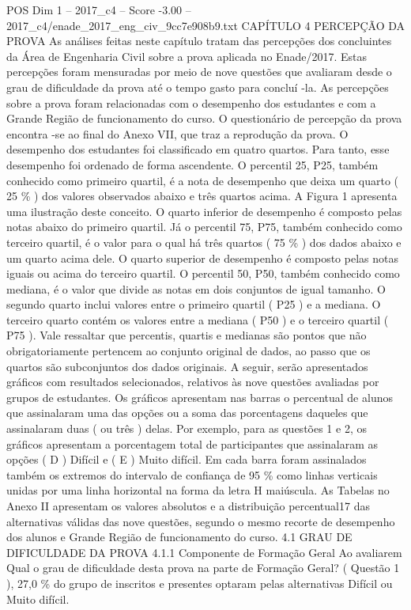 \begin{textsample}{POS Dim 1 – 2017\_c4 – Score -3.00 – 2017\_c4/enade\_2017\_eng\_civ\_9cc7e908b9.txt}  \label{ex:f1_pos_277}
CAPÍTULO 4 PERCEPÇÃO DA PROVA As análises feitas neste capítulo tratam das percepções dos concluintes da Área de Engenharia Civil sobre a prova aplicada no Enade/2017.
Estas percepções foram mensuradas por meio de nove questões que avaliaram desde o grau de dificuldade da prova até o tempo gasto para concluí -la.
As percepções sobre a prova foram relacionadas com o desempenho dos estudantes e com a Grande Região de funcionamento do curso.
O questionário de percepção da prova encontra -se ao final do Anexo VII, que traz a reprodução da prova.
O desempenho dos estudantes foi classificado em quatro quartos.
Para tanto, esse desempenho foi ordenado de forma ascendente.
O percentil 25, P25, também conhecido como primeiro quartil, é a nota de desempenho que deixa um quarto ( 25 \% ) dos valores observados abaixo e três quartos acima.
A Figura 1 apresenta uma ilustração deste conceito.
O quarto inferior de desempenho é composto pelas notas abaixo do primeiro quartil.
Já o percentil 75, P75, também conhecido como terceiro quartil, é o valor para o qual há três quartos ( 75 \% ) dos dados abaixo e um quarto acima dele.
O quarto superior de desempenho é composto pelas notas iguais ou acima do terceiro quartil.
O percentil 50, P50, também conhecido como mediana, é o valor que divide as notas em dois conjuntos de igual tamanho.
O segundo quarto inclui valores entre o primeiro quartil ( P25 ) e a mediana.
O terceiro quarto contém os valores entre a mediana ( P50 ) e o terceiro quartil ( P75 ).
Vale ressaltar que percentis, quartis e medianas são pontos que não obrigatoriamente pertencem ao conjunto original de dados, ao passo que os quartos são subconjuntos dos dados originais.
A seguir, serão apresentados gráficos com resultados selecionados, relativos às nove questões avaliadas por grupos de estudantes.
Os gráficos apresentam nas barras o percentual de alunos que assinalaram uma das opções ou a soma das porcentagens daqueles que assinalaram duas ( ou três ) delas.
Por exemplo, para as questões 1 e 2, os gráficos apresentam a porcentagem total de participantes que assinalaram as opções ( D ) Difícil e ( E ) Muito difícil.
Em cada barra foram assinalados também os extremos do intervalo de confiança de 95 \% como linhas verticais unidas por uma linha horizontal na forma da letra H maiúscula.
As Tabelas no Anexo II apresentam os valores absolutos e a distribuição percentual17 das alternativas válidas das nove questões, segundo o mesmo recorte de desempenho dos alunos e Grande Região de funcionamento do curso. 4.1 GRAU DE DIFICULDADE DA PROVA 4.1.1 Componente de Formação Geral Ao avaliarem Qual o grau de dificuldade desta prova na parte de Formação Geral? ( Questão 1 ), 27,0 \% do grupo de inscritos e presentes optaram pelas alternativas Difícil ou Muito difícil.

\end{textsample}
